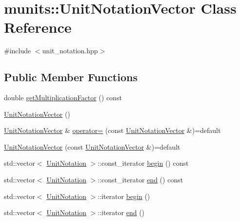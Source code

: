 \hypertarget{classmunits_1_1_unit_notation_vector}{}\section{munits\+:\+:Unit\+Notation\+Vector Class Reference}
\label{classmunits_1_1_unit_notation_vector}


{\ttfamily \#include $<$unit\+\_\+notation.\+hpp$>$}

\subsection*{Public Member Functions}
\begin{DoxyCompactItemize}
\item 
double \hyperlink{classmunits_1_1_unit_notation_vector_a8494c2cb667af23b9f98a9aa2cf00244}{get\+Multiplication\+Factor} () const
\item 
\hyperlink{classmunits_1_1_unit_notation_vector_ad4a4ca58351d23dd049e07bc4b6502b1}{Unit\+Notation\+Vector} ()
\item 
\hyperlink{classmunits_1_1_unit_notation_vector}{Unit\+Notation\+Vector} \& \hyperlink{classmunits_1_1_unit_notation_vector_a9c5a6755c05092c2482596d8fddadf27}{operator=} (const \hyperlink{classmunits_1_1_unit_notation_vector}{Unit\+Notation\+Vector} \&)=default
\item 
\hyperlink{classmunits_1_1_unit_notation_vector_a7e6c9226ca79b122a1be2e3178d2a3b0}{Unit\+Notation\+Vector} (const \hyperlink{classmunits_1_1_unit_notation_vector}{Unit\+Notation\+Vector} \&)=default
\item 
std\+::vector$<$ \hyperlink{classmunits_1_1_unit_notation}{Unit\+Notation} $>$\+::const\+\_\+iterator \hyperlink{classmunits_1_1_unit_notation_vector_af78cd932083d4537b3d80e92ac2bd837}{begin} () const
\item 
std\+::vector$<$ \hyperlink{classmunits_1_1_unit_notation}{Unit\+Notation} $>$\+::const\+\_\+iterator \hyperlink{classmunits_1_1_unit_notation_vector_a26f71e837f2df015d80d7e1c97d95e84}{end} () const
\item 
std\+::vector$<$ \hyperlink{classmunits_1_1_unit_notation}{Unit\+Notation} $>$\+::iterator \hyperlink{classmunits_1_1_unit_notation_vector_a519b16aa356a461d33ebf563bf65f124}{begin} ()
\item 
std\+::vector$<$ \hyperlink{classmunits_1_1_unit_notation}{Unit\+Notation} $>$\+::iterator \hyperlink{classmunits_1_1_unit_notation_vector_a4ef2d42dcdee83c3519a237c569d739b}{end} ()

\end{DoxyCompactItemize}
